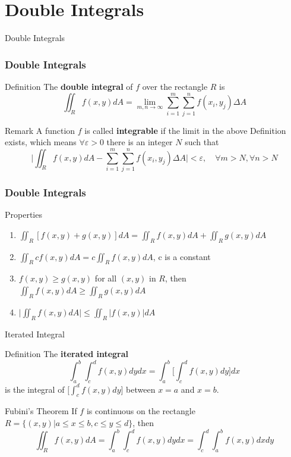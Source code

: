 \documentclass[aspectratio=169, UTF8]{beamer}
\begin{document}
\section{Double Integrals}
\begin{frame}[label=1]{Double Integrals}
    \frametitle{Double Integrals}
    \begin{block}{Definition}
        The \textbf{double integral} of $f$ over the rectangle $R$ is
        \begin{equation*}
            \iint_Rf(x,y)dA=\lim_{m,n\rightarrow\infty}\sum_{i=1}^m\sum_{j=1}^nf(x_i,y_j)\Delta A
        \end{equation*}
    \end{block}
    \begin{block}{Remark}
        A function $f$ is called \textbf{integrable} if the limit in the above Definition exists, which means $\forall \varepsilon>0$ there is an integer $N$ such that 
        \begin{equation*}
            \Big|\iint_Rf(x,y)dA-\sum_{i=1}^m\sum_{j=1}^nf(x_i,y_j)\Delta A\Big |<\varepsilon,\quad \forall m>N, \forall n>N
        \end{equation*}
    \end{block}
\end{frame}
\begin{frame}
    \frametitle{Double Integrals}
    \begin{block}{Properties}
        \begin{enumerate}
            \item $\iint_R[f(x,y)+g(x,y)]dA=\iint_Rf(x,y)dA+\iint_Rg(x,y)dA$
            \item $\iint_Rcf(x,y)dA=c\iint_Rf(x,y)dA$, c is a constant
            \item $f(x,y)\geq g(x,y)$ for all $(x,y)$ in $R$, then $\iint_Rf(x,y)dA\geq \iint_Rg(x,y)dA$
            \item $\Big|\iint_Rf(x,y)dA\Big|\leq\iint_R|f(x,y)|dA$
        \end{enumerate}
    \end{block}
    
\end{frame}
\begin{frame}{Iterated Integral}
    \begin{block}{Definition}
        The \textbf{iterated integral}
        \begin{equation*}
            \int_a^b\int_c^df(x,y)dydx=\int_a^b\Big[\int_c^df(x,y)dy\Big]dx
        \end{equation*}
        is the integral of $\Big[\int_c^df(x,y)dy\Big]$ between $x=a$ and $x=b$.
    \end{block}
    \begin{block}{Fubini's Theorem}
        If $f$ is continuous on the rectangle $R=\{(x,y)|a\leq x\leq b,c\leq y\leq d\}$, then
        \begin{equation*}
            \iint_Rf(x,y)dA=\int_a^b\int_c^df(x,y)dydx=\int_c^d\int_a^bf(x,y)dxdy
        \end{equation*}
    \end{block}
\end{frame}
\end{document}

